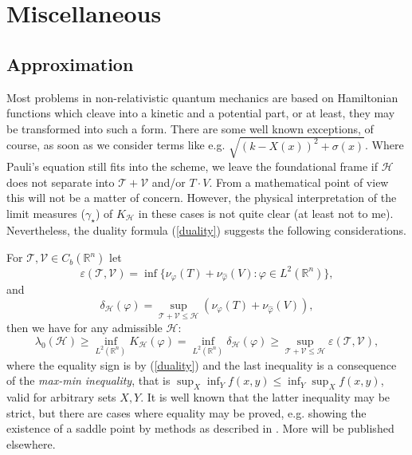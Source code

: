\documentclass[12pt,a4paper]{article}
\newcommand{\RR}[1]{\mathbb{R}^#1}
\newcommand{\HH}{\mathcal{H}}
\newcommand{\TT}{\mathcal{T}}
\newcommand{\VV}{\mathcal{V}}
\begin{document}
\section{Miscellaneous} 
\subsection{Approximation}
Most problems in non-relativistic quantum mechanics are based on Hamiltonian
functions which cleave into a kinetic and a potential part, or at least, they
may be transformed into such a form. There are some well known exceptions, of
course, as soon as we consider terms like e.g. $\sqrt{(k-X(x))^2+\sigma(x)}$.
Where Pauli's equation still fits into the scheme, we leave the foundational
frame if $\HH$ does not separate into $\TT+\VV$ and/or $T\cdot V$. 
From a mathematical point of view this will not be a matter of concern.
However, the physical interpretation of the limit measures ($\gamma_\star$) of
$K_\HH$ in these cases is not quite clear (at least not to me). Nevertheless,
the duality formula (\ref{duality}) suggests the following considerations. 

For $\TT,\VV\in C_b(\RR n)$ let
\begin{equation}
  \varepsilon(\TT,\VV) = 
     \inf\{\nu_\varphi(T)+\nu_{\hat\varphi}(V): \varphi\in L^2(\RR n)\},
\end{equation} 
and
\begin{equation}
  \delta_\HH(\varphi) = 
     \sup_{\TT+\VV\leq \HH} \left(\nu_\varphi(T)+\nu_{\hat\varphi}(V)
       \right),
\end{equation} 
then we have for any admissible $\HH$:
\begin{equation}\label{approx_ineq}
    \lambda_0(\HH)\geq\inf_{L^2(\RR n)} K_\HH(\varphi)=\inf_{L^2(\RR n)}\delta_\HH(\varphi)
      \geq \sup_{\TT+\VV\leq \HH} \varepsilon(\TT,\VV),
\end{equation}
where the equality sign is by (\ref{duality}) and the last inequality is a
consequence of the {\sl max-min inequality}, that is
$\sup_X\inf_Y f(x,y)\leq\inf_Y\sup_X f(x,y)$, valid for arbitrary sets $X,Y$.
It is well known that the latter inequality may be strict, but there are cases
where equality may be proved, e.g. showing the existence of a saddle point by
methods as described in \cite{ekeland_temam}.
More will be published elsewhere.
%
\end{document}
